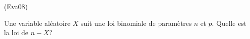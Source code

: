 \begin{tiny}(Eva08)\end{tiny} Une variable aléatoire $X$ suit une loi binomiale de paramètres $n$ et $p$. Quelle est la loi de $n-X$? 